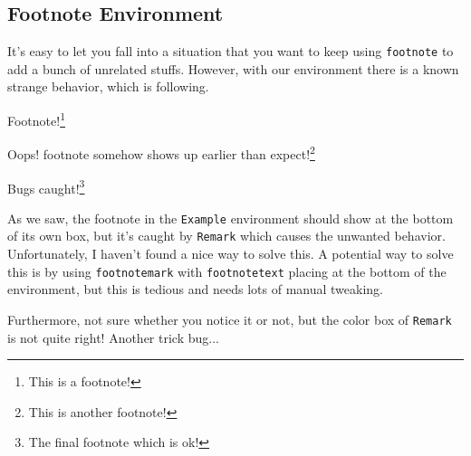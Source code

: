 \subsection{Footnote Environment}
It's easy to let you fall into a situation that you want to keep using \texttt{footnote} to add a bunch of
unrelated stuffs. However, with our environment there is a known strange behavior, which is following.
\begin{eg}
	Footnote!\footnote{This is a footnote!}
	\begin{remark}
		Oops! footnote somehow shows up earlier than expect!\footnote{This is another footnote!}
	\end{remark}

	Bugs caught!\footnote{The final footnote which is ok!}
\end{eg}
As we saw, the footnote in the \texttt{Example} environment should show at the bottom of its own box, but it's caught by \texttt{Remark} which
causes the unwanted behavior. Unfortunately, I haven't found a nice way to solve this. A potential way to solve this is by using \texttt{footnotemark}
with \texttt{footnotetext} placing at the bottom of the environment, but this is tedious and needs lots of manual tweaking.

Furthermore, not sure whether you notice it or not, but the color box of \texttt{Remark} is not quite right! Another trick bug...

